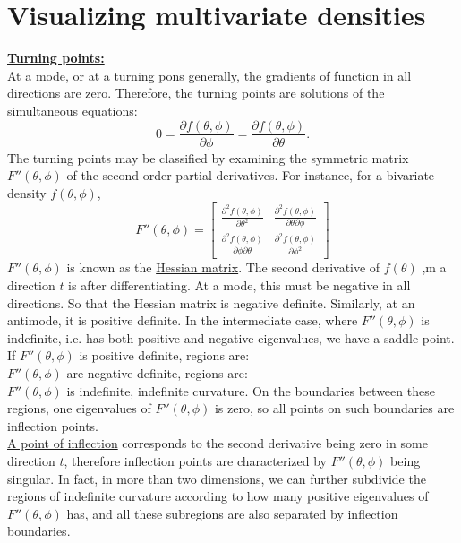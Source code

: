 \documentclass[lecture,12pt,]{pcms-l}
\numberwithin{section}{chapter}
\numberwithin{equation}{chapter}
\theoremstyle{plain}
\theoremstyle{definition}
\theoremstyle{definition}
\begin{document}
\section{Visualizing multivariate densities}

\underline{\bf{Turning points:}}
\\
At a mode, or at a turning pons generally, the gradients of function in all directions are zero. Therefore, the turning points are solutions of the simultaneous equations:
\begin{equation}
0= \frac{\partial f(\theta, \phi)}{\partial \phi}= \frac{\partial f(\theta, \phi)}{\partial \theta}.
\end{equation}
The turning points may be classified by examining the symmetric matrix $F''(\theta
, \phi)$ of the second order partial derivatives. For instance, for a bivariate density $f(\theta, \phi)$,
\begin{equation}
F''(\theta, \phi)=\begin{bmatrix}
\frac{\partial^2 f(\theta, \phi)}{\partial \theta^2 } & \frac{\partial^2 f(\theta, \phi)}{\partial \theta \partial \phi }\\ 
\frac{\partial^2 f(\theta, \phi)}{\partial \phi \partial \theta } & \frac{\partial^2 f(\theta, \phi)}{\partial \phi^2 }
\end{bmatrix}
\end{equation}
$F''(\theta, \phi)$ is known as the \underline{Hessian matrix}. The second derivative of $f(\theta)$ ,m a direction $t$ is after differentiating. At a mode, this must be negative in all directions. So that the Hessian matrix is negative definite. Similarly, at an antimode, it is positive definite. In the intermediate case, where $F''(\theta, \phi)$ is indefinite, i.e. has both positive and negative eigenvalues, we have a saddle point. 
\\
If $F''(\theta, \phi)$ is positive definite, regions are:
\\
$F''(\theta, \phi)$ are negative definite, regions are:
\\
$F''(\theta, \phi)$ is indefinite, indefinite curvature.
On the boundaries between these regions, one eigenvalues of $F''(\theta, \phi)$ is zero, so all points on such boundaries are inflection points.
\\
\underline{A point of inflection} corresponds to the second derivative being zero in some direction $t$, therefore inflection points are characterized by $F''(\theta, \phi)$ being singular. In fact, in more than two dimensions, we can further subdivide the regions of indefinite curvature according to how many positive eigenvalues of $F''(\theta, \phi)$ has, and all these subregions are also separated by inflection boundaries.
\end{document}
